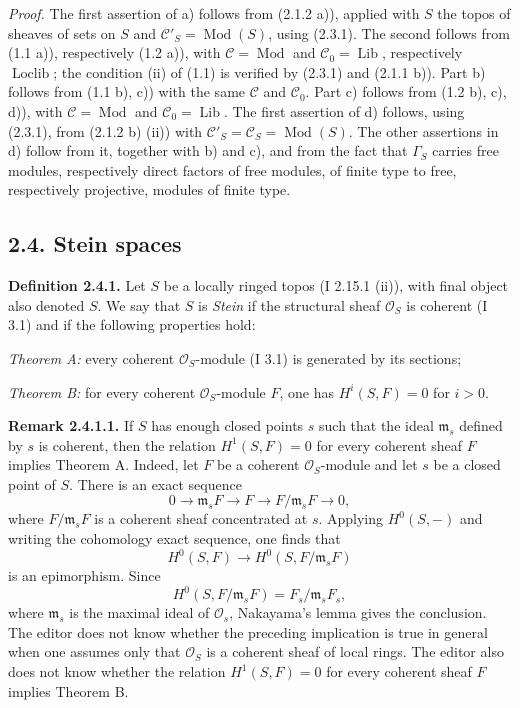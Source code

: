 \documentclass[11pt]{article}
\providecommand{\Mod}{\operatorname{Mod}}
\providecommand{\Lib}{\operatorname{Lib}}
\providecommand{\Loclib}{\operatorname{Loclib}}
\begin{document}
\emph{Proof.} The first assertion of a) follows from (2.1.2 a)), applied with $S$ the topos of sheaves of sets on $S$ and $\mathcal C'_S=\Mod(S)$, using (2.3.1). The second follows from (1.1 a)), respectively (1.2 a)), with $\mathcal C=\Mod$ and $\mathcal C_0=\Lib$, respectively $\Loclib$; the condition (ii) of (1.1) is verified by (2.3.1) and (2.1.1 b)). Part b) follows from (1.1 b), c)) with the same $\mathcal C$ and $\mathcal C_0$. Part c) follows from (1.2 b), c), d)), with $\mathcal C=\Mod$ and $\mathcal C_0=\Lib$. The first assertion of d) follows, using (2.3.1), from (2.1.2 b) (ii)) with $\mathcal C'_S=\mathcal C_S=\Mod(S)$. The other assertions in d) follow from it, together with b) and c), and from the fact that $\Gamma_S$ carries free modules, respectively direct factors of free modules, of finite type to free, respectively projective, modules of finite type.

\subsection*{2.4. Stein spaces}

\textbf{Definition 2.4.1.} Let $S$ be a locally ringed topos (I 2.15.1 (ii)), with final object also denoted $S$. We say that $S$ is \emph{Stein} if the structural sheaf $\mathcal O_S$ is coherent (I 3.1) and if the following properties hold:

\emph{Theorem A:} every coherent $\mathcal O_S$-module (I 3.1) is generated by its sections;

\emph{Theorem B:} for every coherent $\mathcal O_S$-module $F$, one has $H^i(S,F)=0$ for $i>0$.

\textbf{Remark 2.4.1.1.} If $S$ has enough closed points $s$ such that the ideal $\mathfrak m_s$ defined by $s$ is coherent, then the relation $H^1(S,F)=0$ for every coherent sheaf $F$ implies Theorem A. Indeed, let $F$ be a coherent $\mathcal O_S$-module and let $s$ be a closed point of $S$. There is an exact sequence
\[
0\longrightarrow \mathfrak m_sF\longrightarrow F\longrightarrow F/\mathfrak m_sF\longrightarrow0,
\]
where $F/\mathfrak m_sF$ is a coherent sheaf concentrated at $s$. Applying $H^0(S,-)$ and writing the cohomology exact sequence, one finds that
\[
H^0(S,F)\longrightarrow H^0(S,F/\mathfrak m_sF)
\]
is an epimorphism. Since
\[
H^0(S,F/\mathfrak m_sF)=F_s/\mathfrak m_sF_s,
\]
where $\mathfrak m_s$ is the maximal ideal of $\mathcal O_s$, Nakayama's lemma gives the conclusion. The editor does not know whether the preceding implication is true in general when one assumes only that $\mathcal O_S$ is a coherent sheaf of local rings. The editor also does not know whether the relation $H^1(S,F)=0$ for every coherent sheaf $F$ implies Theorem B.
\end{document}
